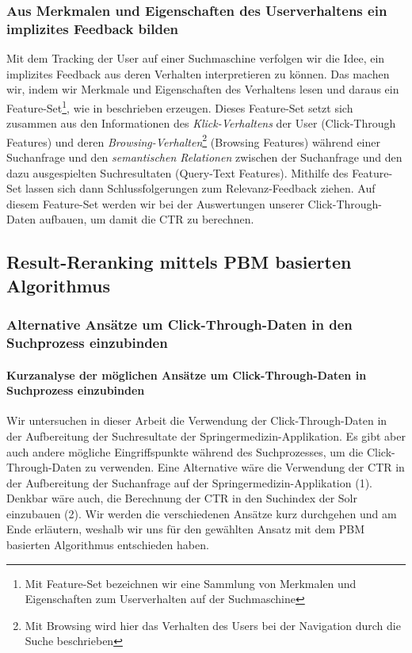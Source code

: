 \subsubsection{Aus Merkmalen und Eigenschaften des Userverhaltens ein implizites Feedback bilden}
\label{sec:Grundlagen:Grundbegriffe:Click-Through-Daten:UserverhaltensFeedback}

Mit dem Tracking der User auf einer Suchmaschine verfolgen wir die Idee, ein implizites Feedback aus deren Verhalten interpretieren zu können. Das machen wir, indem wir Merkmale und Eigenschaften des Verhaltens lesen und daraus ein Feature-Set\footnote{Mit Feature-Set bezeichnen wir eine Sammlung von Merkmalen und Eigenschaften zum Userverhalten auf der Suchmaschine}, wie in \cite{IWUSBI} beschrieben erzeugen. Dieses Feature-Set setzt sich zusammen aus den Informationen des \textit{Klick-Verhaltens} der User (Click-Through Features) und deren \textit{Browsing-Verhalten}\footnote{Mit Browsing wird hier das Verhalten des Users bei der Navigation durch die Suche beschrieben} (Browsing Features) während einer Suchanfrage und den \textit{semantischen Relationen} zwischen der Suchanfrage und den dazu ausgespielten Suchresultaten (Query-Text Features). Mithilfe des Feature-Set lassen sich dann  Schlussfolgerungen zum Relevanz-Feedback ziehen. Auf diesem Feature-Set werden wir bei der Auswertungen unserer Click-Through-Daten aufbauen, um damit die CTR zu berechnen.


\subsection{Result-Reranking mittels PBM basierten Algorithmus}
\label{sec:Grundlagen:Grundbegriffe:Result-RerankingPBM}

\subsubsection{Alternative Ansätze um Click-Through-Daten in den Suchprozess einzubinden}
\label{sec:Grundlagen:Grundbegriffe:Result-RerankingPBM:AlternativenSucheEinbinden}

\paragraph{Kurzanalyse der möglichen Ansätze um Click-Through-Daten in Suchprozess einzubinden} 
Wir untersuchen in dieser Arbeit die Verwendung der Click-Through-Daten in der Aufbereitung der Suchresultate der Springermedizin-Applikation. Es gibt aber auch andere mögliche Eingriffspunkte während des Suchprozesses, um die Click-Through-Daten zu verwenden. Eine Alternative wäre die Verwendung der CTR in der Aufbereitung der Suchanfrage auf der Springermedizin-Applikation (1). Denkbar wäre auch, die Berechnung der CTR in den Suchindex der Solr einzubauen (2). Wir werden die verschiedenen Ansätze kurz durchgehen und am Ende erläutern, weshalb wir uns für den gewählten Ansatz mit dem PBM basierten Algorithmus entschieden haben.

